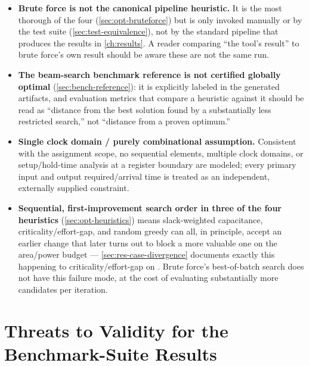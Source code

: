 \begin{itemize}
    \item \textbf{Brute force is not the canonical pipeline heuristic.}
          It is the most thorough of the four (\cref{sec:opt-bruteforce})
          but is only invoked manually or by the test suite
          (\cref{sec:test-equivalence}), not by the standard
           pipeline that produces the results in
          \cref{ch:results}. A reader comparing ``the tool's result'' to
          brute force's own result should be aware these are not the same
          run.
    \item \textbf{The beam-search benchmark reference is not certified
          globally optimal} (\cref{sec:bench-reference}): it is explicitly
          labeled  in the generated
          artifacts, and evaluation metrics that compare a heuristic
          against it should be read as ``distance from the best solution
          found by a substantially less restricted search,'' not ``distance
          from a proven optimum.''
    \item \textbf{Single clock domain / purely combinational assumption.}
          Consistent with the assignment scope, no sequential elements,
          multiple clock domains, or setup/hold-time analysis at a
          register boundary are modeled; every primary input and output
          required/arrival time is treated as an independent, externally
          supplied constraint.
    \item \textbf{Sequential, first-improvement search order in three of
          the four heuristics} (\cref{sec:opt-heuristics}) means
          slack-weighted capacitance, criticality/effort-gap, and random
          greedy can all, in principle, accept an earlier change that
          later turns out to block a more valuable one on the area/power
          budget --- \cref{sec:res-case-divergence} documents exactly this
          happening to criticality/effort-gap on . Brute force's
          best-of-batch search does not have this failure mode, at the
          cost of evaluating substantially more candidates per iteration.
\end{itemize}

\section{Threats to Validity for the Benchmark-Suite Results}
\label{sec:disc-threats}

